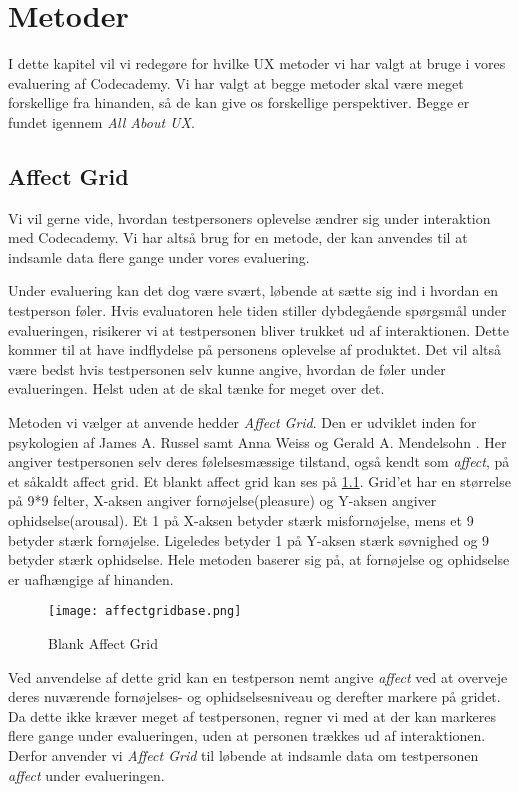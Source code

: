 \chapter{Metoder}\label{ch:met}
I dette kapitel vil vi redegøre for hvilke UX metoder vi har valgt at bruge i vores evaluering af Codecademy. Vi har valgt at begge metoder skal være meget forskellige fra hinanden, så de kan give os forskellige perspektiver. Begge er fundet igennem \textit{All About UX}\cite{AllAboutUX}.

\section{Affect Grid}\label{sec:AG}
Vi vil gerne vide, hvordan testpersoners oplevelse ændrer sig under interaktion med Codecademy. Vi har altså brug for en metode, der kan anvendes til at indsamle data flere gange under vores evaluering. 

Under evaluering kan det dog være svært, løbende at sætte sig ind i hvordan en testperson føler. Hvis evaluatoren hele tiden stiller dybdegående spørgsmål under evalueringen, risikerer vi at testpersonen bliver trukket ud af interaktionen. Dette kommer til at have indflydelse på personens oplevelse af produktet. Det vil altså være bedst hvis testpersonen selv kunne angive, hvordan de føler under evalueringen. Helst uden at de skal tænke for meget over det. 

Metoden vi vælger at anvende hedder \textit{Affect Grid}. Den er udviklet inden for psykologien af James A. Russel samt Anna Weiss og Gerald A. Mendelsohn \cite{AffectGrid}. Her angiver testpersonen selv deres følelsesmæssige tilstand, også kendt som \textit{affect}, på et såkaldt affect grid. Et blankt affect grid kan ses på \cref{fig:affectgrid}. Grid'et har en størrelse på 9*9 felter, X-aksen angiver fornøjelse(pleasure) og Y-aksen angiver ophidselse(arousal). Et 1 på X-aksen betyder stærk misfornøjelse, mens et 9 betyder stærk fornøjelse. Ligeledes betyder 1 på Y-aksen stærk søvnighed og 9 betyder stærk ophidselse. Hele metoden baserer sig på, at fornøjelse og ophidselse er uafhængige af hinanden. 

\begin{figure}[h]
\centering
\texttt{[image: affectgridbase.png]}
\caption{Blank Affect Grid}
\label{fig:affectgrid}
\end{figure}

Ved anvendelse af dette grid kan en testperson nemt angive \textit{affect} ved at overveje deres nuværende fornøjelses- og ophidselsesniveau og derefter markere på gridet. Da dette ikke kræver meget af testpersonen, regner vi med at der kan markeres flere gange under evalueringen, uden at personen trækkes ud af interaktionen. Derfor anvender vi \textit{Affect Grid} til løbende at indsamle data om testpersonen \textit{affect} under evalueringen.

